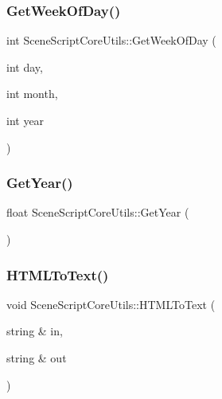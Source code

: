 \hypertarget{class_scene_script_core_utils_a5600deb19c410de48dcfea3b5231f4e1}{}\label{class_scene_script_core_utils_a5600deb19c410de48dcfea3b5231f4e1} 
\subsubsection{\texorpdfstring{Get\+Week\+Of\+Day()}{GetWeekOfDay()}}
{\footnotesize\ttfamily int Scene\+Script\+Core\+Utils\+::\+Get\+Week\+Of\+Day (\begin{DoxyParamCaption}\item[{int}]{day,  }\item[{int}]{month,  }\item[{int}]{year }\end{DoxyParamCaption})}

\hypertarget{class_scene_script_core_utils_a51a9b16c409c5b8c58979208dcc5dfab}{}\label{class_scene_script_core_utils_a51a9b16c409c5b8c58979208dcc5dfab} 
\subsubsection{\texorpdfstring{Get\+Year()}{GetYear()}}
{\footnotesize\ttfamily float Scene\+Script\+Core\+Utils\+::\+Get\+Year (\begin{DoxyParamCaption}{ }\end{DoxyParamCaption})}

\hypertarget{class_scene_script_core_utils_afaf74e221cef71b3f63c8db5cea18a67}{}\label{class_scene_script_core_utils_afaf74e221cef71b3f63c8db5cea18a67} 
\subsubsection{\texorpdfstring{H\+T\+M\+L\+To\+Text()}{HTMLToText()}}
{\footnotesize\ttfamily void Scene\+Script\+Core\+Utils\+::\+H\+T\+M\+L\+To\+Text (\begin{DoxyParamCaption}\item[{string \&}]{in,  }\item[{string \&}]{out }\end{DoxyParamCaption})}

